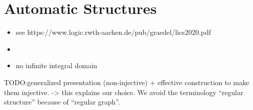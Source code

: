 \section{Automatic Structures}
\label{sec:preliminaries-automatic-structures-automatic-structures}

\begin{itemize}
	\itemAP domain and relation of a ""presentation"": $\intro*\domainPres{\+A}$ and $\intro*\relPres{\+R}{\+A}$ 
	\itemAP ""automatic structure"" and ""automatic graph""
	\item see https://www.logic.rwth-aachen.de/pub/graedel/lics2020.pdf
	\item \cite[\S~6]{KhoussainovNerode1995AutomaticPresentations}
	\item no infinite integral domain \cite{KhoussainovNiesRubinStephan2007Automatic}
\end{itemize}

TODO:generalized presentation (non-injective) + effective construction to make them injective.
-> this explains our choice. We avoid the terminology ``regular structure'' because of
``regular graph''.
